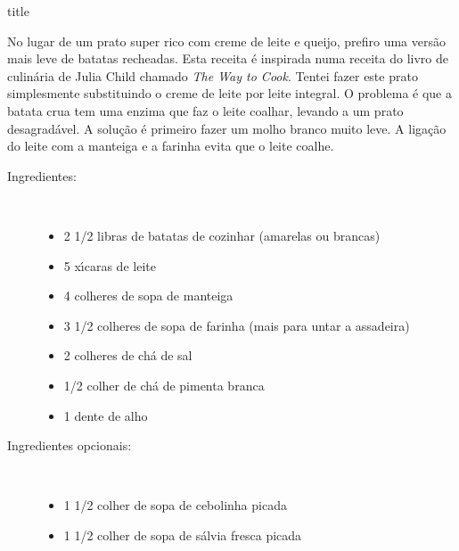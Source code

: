 \documentclass [11pt, letterpaper] {article}
\begin{document}
 {title}


No lugar de um prato super rico com creme de leite e queijo, prefiro uma vers\~ao mais leve de batatas recheadas. Esta receita \'e inspirada numa receita do livro de culin\'aria de Julia Child chamado {\it The Way to Cook}. Tentei fazer este prato simplesmente substituindo o creme de leite por leite integral. O problema \'e que a batata crua tem uma enzima que faz o leite coalhar, levando a um prato desagrad\'avel. A solu\c{c}\~ao \'e primeiro fazer um molho branco muito leve. A liga\c{c}\~ao do leite com a manteiga e a farinha evita que o leite coalhe.


\begin {description}

\item [Ingredientes:] \ \\
	\begin {itemize}
	\item 2 1/2 libras de batatas de cozinhar (amarelas ou brancas)
	\item 5 x\'{\i}caras de leite
	\item 4 colheres de sopa de manteiga
	\item 3 1/2 colheres de sopa de farinha (mais para untar a assadeira)
	\item 2 colheres de ch\'a de sal
	\item 1/2 colher de ch\'a de pimenta branca
	\item 1 dente de alho
	\end {itemize}

\item [Ingredientes opcionais:] \ \\
	\begin {itemize}
	\item 1 1/2 colher de sopa de cebolinha picada
	\item 1 1/2 colher de sopa de s\'alvia fresca picada
	\end {itemize}


\end{description}
\end{document}
